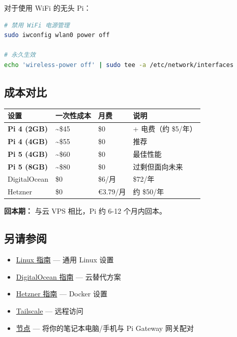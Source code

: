 对于使用 WiFi 的无头 Pi：

\begin{lstlisting}[language=bash]
# 禁用 WiFi 电源管理
sudo iwconfig wlan0 power off

# 永久生效
echo 'wireless-power off' | sudo tee -a /etc/network/interfaces
\end{lstlisting}


\hrulefill


\subsection{成本对比}



\begin{table}[h]
\centering
\small
\begin{tabular}{|l|l|l|l|}
\hline
设置 & 一次性成本 & 月费 & 说明 \\
\hline
\textbf{Pi 4 (2GB)} & \textasciitilde{}\$45 & \$0 & + 电费（约 \$5/年） \\
\hline
\textbf{Pi 4 (4GB)} & \textasciitilde{}\$55 & \$0 & 推荐 \\
\hline
\textbf{Pi 5 (4GB)} & \textasciitilde{}\$60 & \$0 & 最佳性能 \\
\hline
\textbf{Pi 5 (8GB)} & \textasciitilde{}\$80 & \$0 & 过剩但面向未来 \\
\hline
DigitalOcean & \$0 & \$6/月 & \$72/年 \\
\hline
Hetzner & \$0 & €3.79/月 & 约 \$50/年 \\
\hline
\end{tabular}
\end{table}



\textbf{回本期：} 与云 VPS 相比，Pi 约 6-12 个月内回本。

\hrulefill


\subsection{另请参阅}


\begin{itemize}
  \item \href{/platforms/linux}{Linux 指南} — 通用 Linux 设置
  \item \href{/platforms/digitalocean}{DigitalOcean 指南} — 云替代方案
  \item \href{/install/hetzner}{Hetzner 指南} — Docker 设置
  \item \href{/gateway/tailscale}{Tailscale} — 远程访问
  \item \href{/nodes}{节点} — 将你的笔记本电脑/手机与 Pi Gateway 网关配对
\end{itemize}




